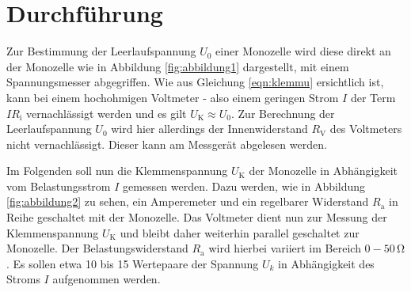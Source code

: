 
\section{Durchführung}
\label{sec:Durchführung}
Zur Bestimmung der Leerlaufspannung $U_0$ einer Monozelle wird diese direkt an der Monozelle wie in Abbildung \ref{fig:abbildung1} dargestellt, mit einem Spannungsmesser abgegriffen.
Wie aus Gleichung \eqref{eqn:klemmu} ersichtlich ist, kann bei einem hochohmigen Voltmeter - also einem geringen Strom $I$ der Term $I R_{\text{i}}$ vernachlässigt werden und es gilt $U_{\text{K}} \approx U_0$. 
Zur Berechnung der Leerlaufspannung $U_0$ wird hier allerdings der Innenwiderstand $R_{\text{V}}$ des Voltmeters nicht vernachlässigt. Dieser kann am Messgerät abgelesen werden.

Im Folgenden soll nun die Klemmenspannung $U_{\text{K}}$ der Monozelle in Abhängigkeit vom Belastungsstrom $I$ gemessen werden.
Dazu werden, wie in Abbildung \ref{fig:abbildung2} zu sehen, ein Amperemeter und ein regelbarer Widerstand $R_{\text{a}}$ in Reihe geschaltet mit der Monozelle. Das Voltmeter dient nun zur Messung der Klemmenspannung $U_{\text{K}}$ und bleibt daher weiterhin parallel geschaltet zur Monozelle.
Der Belastungswiderstand $R_{\text{a}}$ wird hierbei variiert im Bereich $0-50 \, \si{\ohm}$.
Es sollen etwa 10 bis 15 Wertepaare der Spannung $U_k$ in Abhängigkeit des Stroms $I$ aufgenommen werden.




